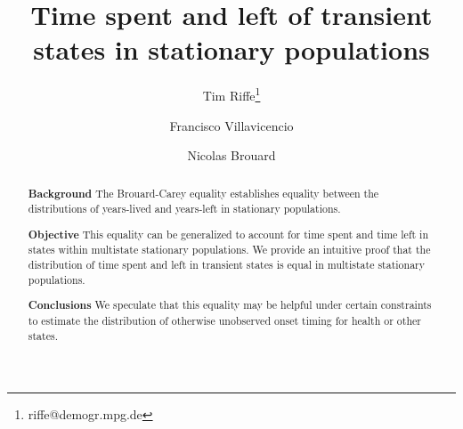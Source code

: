 \documentclass[12pt,oneside,a4paper]{article}
\newcommand{\absdiv}[1]{%
  \par\addvspace{.5\baselineskip}%
  \noindent\textbf{#1}\quad\ignorespaces
}
\theoremstyle{definition}
\begin{document}
\title{Time spent and left of transient states in
stationary populations}

\author[1]{Tim Riffe\thanks{riffe@demogr.mpg.de}}
\author[2]{Francisco Villavicencio}
\author[3]{Nicolas Brouard}





\maketitle

\vspace{-2em}

              
\maketitle

\begin{abstract}
\absdiv{Background} The Brouard-Carey equality establishes equality
between the distributions of years-lived and years-left in stationary populations. 
\absdiv{Objective} This equality can be generalized to account for time
spent and time left in states within multistate stationary populations. We
provide an intuitive proof that the distribution of time spent and left in
transient states is equal in multistate stationary populations. 
\absdiv{Conclusions} We speculate that this equality may be helpful under
certain constraints to estimate the distribution of otherwise unobserved onset timing for health or other states.
\end{abstract}
\end{document}
